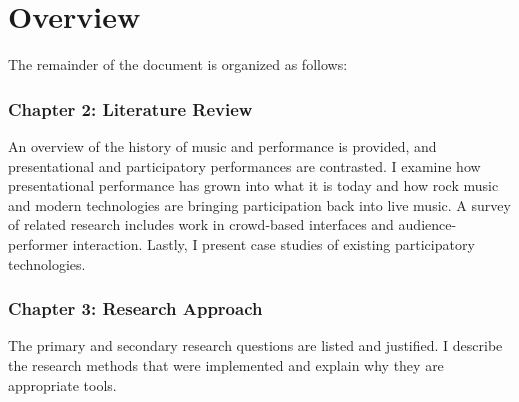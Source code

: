 

\section{Overview}

The remainder of the document is organized as follows:

\subsubsection{Chapter 2: Literature Review}
	
An overview of the history of music and performance is provided, and presentational and participatory performances are contrasted. I examine how presentational performance has grown into what it is today and how rock music and modern technologies are bringing participation back into live music. A survey of related research includes work in crowd-based interfaces and audience-performer interaction. Lastly, I present case studies of existing participatory technologies.
	
\subsubsection{Chapter 3: Research Approach}
	
The primary and secondary research questions are listed and justified. I describe the research methods that were implemented and explain why they are appropriate tools.
			
